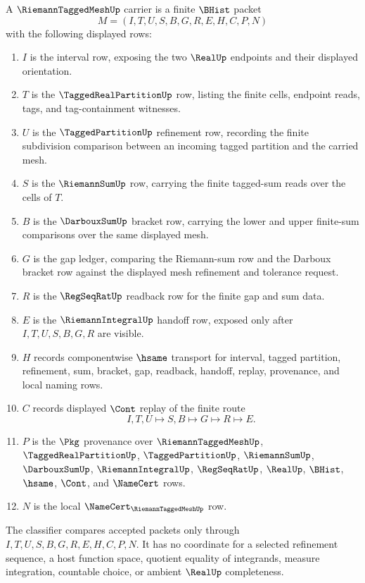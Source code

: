 \begin{definition}
\label{def:riemann-tagged-mesh-carrier}
A $\RiemannTaggedMeshUp$ carrier is a finite $\BHist$ packet
$$
M=(I,T,U,S,B,G,R,E,H,C,P,N)
$$
with the following displayed rows:
\begin{enumerate}
\item $I$ is the interval row, exposing the two $\RealUp$ endpoints and their displayed orientation.
\item $T$ is the $\TaggedRealPartitionUp$ row, listing the finite cells, endpoint reads, tags, and tag-containment witnesses.
\item $U$ is the $\TaggedPartitionUp$ refinement row, recording the finite subdivision comparison between an incoming tagged partition and the carried mesh.
\item $S$ is the $\RiemannSumUp$ row, carrying the finite tagged-sum reads over the cells of $T$.
\item $B$ is the $\DarbouxSumUp$ bracket row, carrying the lower and upper finite-sum comparisons over the same displayed mesh.
\item $G$ is the gap ledger, comparing the Riemann-sum row and the Darboux bracket row against the displayed mesh refinement and tolerance request.
\item $R$ is the $\RegSeqRatUp$ readback row for the finite gap and sum data.
\item $E$ is the $\RiemannIntegralUp$ handoff row, exposed only after $I,T,U,S,B,G,R$ are visible.
\item $H$ records componentwise $\hsame$ transport for interval, tagged partition, refinement, sum, bracket, gap, readback, handoff, replay, provenance, and local naming rows.
\item $C$ records displayed $\Cont$ replay of the finite route
$$
I,T,U \longmapsto S,B \longmapsto G \longmapsto R \longmapsto E .
$$
\item $P$ is the $\Pkg$ provenance over $\RiemannTaggedMeshUp$, $\TaggedRealPartitionUp$, $\TaggedPartitionUp$, $\RiemannSumUp$, $\DarbouxSumUp$, $\RiemannIntegralUp$, $\RegSeqRatUp$, $\RealUp$, $\BHist$, $\hsame$, $\Cont$, and $\NameCert$ rows.
\item $N$ is the local $\NameCert_{\RiemannTaggedMeshUp}$ row.
\end{enumerate}
The classifier compares accepted packets only through $I,T,U,S,B,G,R,E,H,C,P,N$. It has no coordinate for a selected refinement sequence, a host function space, quotient equality of integrands, measure integration, countable choice, or ambient $\RealUp$ completeness.
\end{definition}

